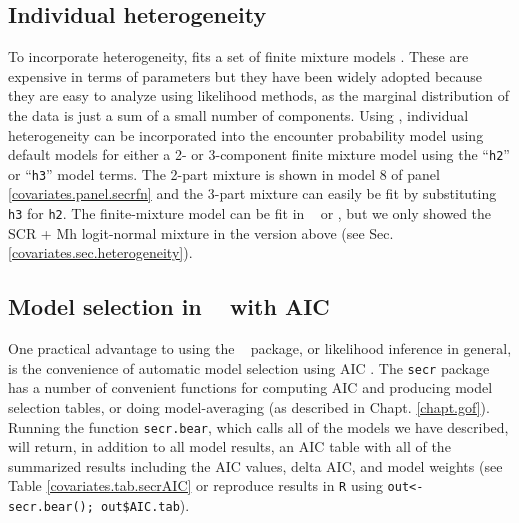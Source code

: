 \subsection{Individual heterogeneity}
\label{covariates.sec.secrH2}

To incorporate heterogeneity, \secr fits a set of 
finite mixture models \citep{norris_pollock:1996,
  pledger:2000}. These are expensive in terms of parameters but 
they have been widely adopted because they are easy to analyze using
likelihood methods, as the marginal distribution of the data is just a
sum of a small number of components.
Using \secr,  individual heterogeneity can be incorporated
into the encounter probability model using default models for 
 either a 2- or 3-component finite
mixture model 
using the  ``\mbox{\tt h2}'' or
``\mbox{\tt h3}'' model terms.
 The 2-part mixture is shown in model 8 of panel
\ref{covariates.panel.secrfn} and the 3-part mixture can easily be fit by
substituting \mbox{\tt h3} for \mbox{\tt h2}.  
The finite-mixture model 
can be fit in \jags~ or \bugs, but we only showed
the SCR + Mh logit-normal mixture in the version above (see
Sec. \ref{covariates.sec.heterogeneity}).



\subsection{Model selection in \secr~ with AIC}

One practical advantage to using the \secr~ package, or likelihood
inference in general, is the convenience of automatic model selection
using AIC \citep{burnham_anderson:2002}. The \mbox{\tt secr} package
has a number of convenient functions for computing AIC and producing
model selection tables, or doing model-averaging (as described in
 Chapt. \ref{chapt.gof}).
Running the function {\tt secr.bear}, which calls all of the models we
have described, will return, in addition to all model results, 
an AIC table with all of the summarized results including the AIC values,
delta AIC, and model weights (see Table \ref{covariates.tab.secrAIC}
or reproduce results in {\tt R} using {\tt out<- secr.bear(); out\$AIC.tab}). 


